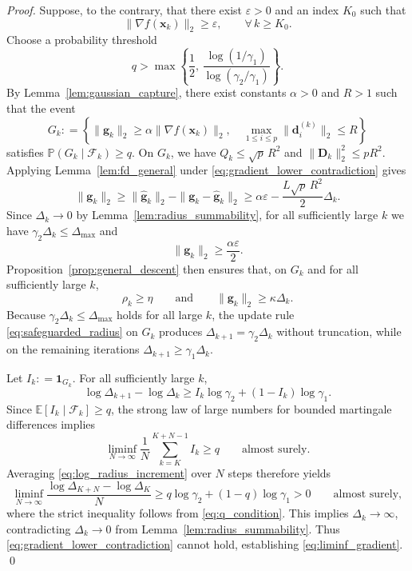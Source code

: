 \documentclass[smallextended]{svjour3}
\newcommand{\bx}{\bm{x}}
\newcommand{\bd}{\bm{d}}
\newcommand{\bg}{\bm{g}}
\providecommand{\coloneqq}{\mathrel{\mathop:}=}
\begin{document}
\begin{proof}
Suppose, to the contrary, that there exist $\varepsilon>0$ and an index $K_0$ such that
\begin{equation}
\label{eq:gradient_lower_contradiction}
\|\nabla f(\bx_k)\|_2 \ge \varepsilon, \qquad \forall\, k\ge K_0.
\end{equation}
Choose a probability threshold
\begin{equation}
\label{eq:q_condition}
q > \max\left\{ \frac{1}{2},\, \frac{\log(1/\gamma_1)}{\log(\gamma_2/\gamma_1)} \right\}.
\end{equation}
By Lemma~\ref{lem:gaussian_capture}, there exist constants $\alpha>0$ and $R>1$ such that the event
\[
G_k \coloneqq \left\{ \|\hat{\bg}_k\|_2 \ge \alpha\|\nabla f(\bx_k)\|_2, \quad \max_{1\le i\le p}\|\bd_i^{(k)}\|_2\le R \right\}
\]
satisfies $\mathbb P(G_k\mid\mathcal F_k)\ge q$. On $G_k$, we have $Q_k\le\sqrt p\,R^2$ and $\|\bm D_k\|_2^2\le pR^2$. Applying Lemma~\ref{lem:fd_general} under \eqref{eq:gradient_lower_contradiction} gives
\[
\|\bg_k\|_2 \ge \|\hat{\bg}_k\|_2 - \|\bg_k-\hat{\bg}_k\|_2 \ge \alpha\varepsilon - \frac{L\sqrt p\,R^2}{2}\Delta_k.
\]
Since $\Delta_k\to0$ by Lemma~\ref{lem:radius_summability}, for all sufficiently large $k$ we have $\gamma_2\Delta_k \le \Delta_{\max}$ and
\begin{equation}
\label{eq:g_lower_good}
\|\bg_k\|_2 \ge \frac{\alpha\varepsilon}{2}.
\end{equation}
Proposition~\ref{prop:general_descent} then ensures that, on $G_k$ and for all sufficiently large $k$,
\[
\rho_k\ge\eta \qquad \text{and} \qquad \|\bg_k\|_2\ge\kappa\Delta_k.
\]
Because $\gamma_2\Delta_k \le \Delta_{\max}$ holds for all large $k$, the update rule \eqref{eq:safeguarded_radius} on $G_k$ produces $\Delta_{k+1}=\gamma_2\Delta_k$ without truncation, while on the remaining iterations $\Delta_{k+1}\ge\gamma_1\Delta_k$.

Let $I_k \coloneqq \mathbf{1}_{G_k}$. For all sufficiently large $k$,
\begin{equation}
\label{eq:log_radius_increment}
\log\Delta_{k+1}-\log\Delta_k \ge I_k\log\gamma_2 + (1-I_k)\log\gamma_1.
\end{equation}
Since $\mathbb E[I_k\mid\mathcal F_k] \ge q$, the strong law of large numbers for bounded martingale differences implies
\[
\liminf_{N\to\infty} \frac{1}{N} \sum_{k=K}^{K+N-1} I_k \ge q \qquad \text{almost surely}.
\]
Averaging \eqref{eq:log_radius_increment} over $N$ steps therefore yields
\[
\liminf_{N\to\infty} \frac{\log\Delta_{K+N}-\log\Delta_K}{N} \ge q\log\gamma_2 + (1-q)\log\gamma_1 > 0 \qquad \text{almost surely},
\]
where the strict inequality follows from \eqref{eq:q_condition}. This implies $\Delta_k \to \infty$, contradicting $\Delta_k\to0$ from Lemma~\ref{lem:radius_summability}. Thus \eqref{eq:gradient_lower_contradiction} cannot hold, establishing \eqref{eq:liminf_gradient}.
\qed
\end{proof}
\end{document}
